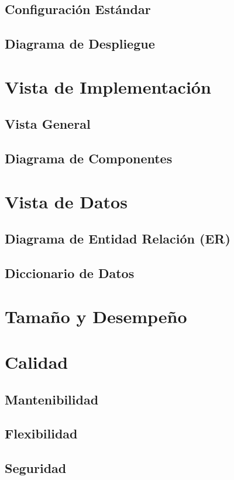 \documentclass{article}
\begin{document}
    \subsection{Configuración Estándar}
    \subsection{Diagrama de Despliegue}


    \section{Vista de Implementación} \label{vistaImplementacion}
    \subsection{Vista General}
    \subsection{Diagrama de Componentes}


    \section{Vista de Datos} \label{vistaDatos}
    \subsection{Diagrama de Entidad Relación (ER)}
    \subsection{Diccionario de Datos}


    \section{Tamaño y Desempeño} \label{tamDesemp}

    \section{Calidad}
    \subsection{Mantenibilidad}
    \subsection{Flexibilidad}
    \subsection{Seguridad}
\end{document}
